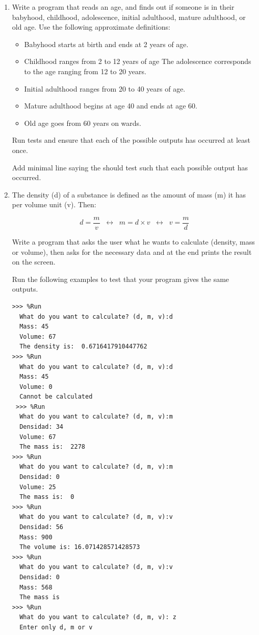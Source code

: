 \documentclass[
  fontsize=10pt,
  a4paper,
]{scrartcl}
\newenvironment{howTILEd}%
  {\begin{mdframed}[skipabove=10pt,skipbelow=10pt,backgroundcolor=pink!40]}%
  {\end{mdframed}}
\begin{document}
\begin{enumerate}
\item Write a program that reads an age, and finds out if someone is in their babyhood, childhood, adolescence, initial adulthood, mature adulthood, or old age. Use the following approximate definitions:

\begin{itemize}
\item Babyhood starts at birth and ends at 2 years of age.
\item Childhood ranges from 2 to 12 years of age
\itemcorresponde The adolescence corresponds to the age ranging from 12 to 20 years.
\item Initial adulthood ranges from 20 to 40 years of age.
\item Mature adulthood begins at age 40 and ends at age 60.
\item Old age goes from 60 years on wards.
\end{itemize}

Run tests and ensure that each of the possible outputs has occurred at least once.

\begin{howTILEd}
Add minimal line saying the should test such that each possible output has occurred.
\end{howTILEd}


\item The density (d) of a substance is defined as the amount of mass (m) it has per volume unit (v). Then:

\[d = \frac{m}{v} \;\;\leftrightarrow\;\; m = d \times v \;\;\leftrightarrow\;\; v = \frac{m}{d} 
\]

Write a program that asks the user what he wants to calculate (density, mass or volume), then asks for the necessary data and at the end prints the result on the screen.

Run the following examples to test that your program gives the same outputs.

\begin{small}
\begin{Verbatim}[frame=single, label={\em examples of test executions}]
>>> %Run 
  What do you want to calculate? (d, m, v):d
  Mass: 45
  Volume: 67
  The density is:  0.6716417910447762
>>> %Run 
  What do you want to calculate? (d, m, v):d
  Mass: 45
  Volume: 0
  Cannot be calculated
 >>> %Run 
  What do you want to calculate? (d, m, v):m
  Densidad: 34
  Volume: 67
  The mass is:  2278
>>> %Run 
  What do you want to calculate? (d, m, v):m
  Densidad: 0
  Volume: 25
  The mass is:  0
>>> %Run 
  What do you want to calculate? (d, m, v):v
  Densidad: 56
  Mass: 900
  The volume is: 16.071428571428573
>>> %Run 
  What do you want to calculate? (d, m, v):v
  Densidad: 0
  Mass: 568
  The mass is
>>> %Run 
  What do you want to calculate? (d, m, v): z
  Enter only d, m or v
\end{Verbatim}
\end{small}


\end{enumerate}
\end{document}
